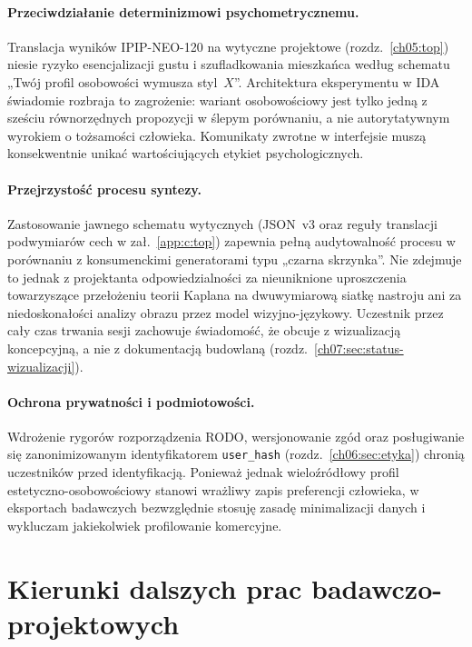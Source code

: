 \paragraph{Przeciwdziałanie determinizmowi psychometrycznemu.}
Translacja wyników IPIP-NEO-120 na wytyczne projektowe (rozdz.~\ref{ch05:top}) niesie ryzyko esencjalizacji gustu i szufladkowania mieszkańca według schematu „Twój profil osobowości wymusza styl~$X$”. Architektura eksperymentu w IDA świadomie rozbraja to zagrożenie: wariant osobowościowy jest tylko jedną z sześciu równorzędnych propozycji w ślepym porównaniu, a nie autorytatywnym wyrokiem o tożsamości człowieka. Komunikaty zwrotne w interfejsie muszą konsekwentnie unikać wartościujących etykiet psychologicznych.

\paragraph{Przejrzystość procesu syntezy.}
Zastosowanie jawnego schematu wytycznych (JSON~v3 oraz reguły translacji podwymiarów cech w zał.~\ref{app:c:top}) zapewnia pełną audytowalność procesu w porównaniu z konsumenckimi generatorami typu „czarna skrzynka”. Nie zdejmuje to jednak z projektanta odpowiedzialności za nieuniknione uproszczenia towarzyszące przełożeniu teorii Kaplana na dwuwymiarową siatkę nastroju ani za niedoskonałości analizy obrazu przez model wizyjno-językowy. Uczestnik przez cały czas trwania sesji zachowuje świadomość, że obcuje z wizualizacją koncepcyjną, a nie z dokumentacją budowlaną (rozdz.~\ref{ch07:sec:status-wizualizacji}).

\paragraph{Ochrona prywatności i podmiotowości.}
Wdrożenie rygorów rozporządzenia RODO, wersjonowanie zgód oraz posługiwanie się zanonimizowanym identyfikatorem \texttt{user\_hash} (rozdz.~\ref{ch06:sec:etyka}) chronią uczestników przed identyfikacją. Ponieważ jednak wieloźródłowy profil estetyczno-osobowościowy stanowi wrażliwy zapis preferencji człowieka, w eksportach badawczych bezwzględnie stosuję zasadę minimalizacji danych i wykluczam jakiekolwiek profilowanie komercyjne.

\section{Kierunki dalszych prac badawczo-projektowych}
\label{ch09:sec:dalsze}

